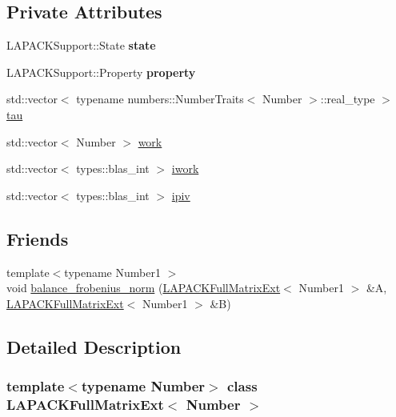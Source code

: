 \subsection*{Private Attributes}
\begin{DoxyCompactItemize}
\item 
\mbox{\label{classLAPACKFullMatrixExt_adec2cd643cd2bf3d66293f43e72af687}} 
L\+A\+P\+A\+C\+K\+Support\+::\+State {\bfseries state}
\item 
\mbox{\label{classLAPACKFullMatrixExt_a17c0100c66b9c4be46b87cbceea1be6d}} 
L\+A\+P\+A\+C\+K\+Support\+::\+Property {\bfseries property}
\item 
std\+::vector$<$ typename numbers\+::\+Number\+Traits$<$ Number $>$\+::real\+\_\+type $>$ \hyperlink{classLAPACKFullMatrixExt_a91fb784892cbe9d24ad2062fbf642635}{tau}
\item 
std\+::vector$<$ Number $>$ \hyperlink{classLAPACKFullMatrixExt_a971d29c6d7664fca553b6ba377519946}{work}
\item 
std\+::vector$<$ types\+::blas\+\_\+int $>$ \hyperlink{classLAPACKFullMatrixExt_ac091f1f6af485b451c4c9398abb67230}{iwork}
\item 
std\+::vector$<$ types\+::blas\+\_\+int $>$ \hyperlink{classLAPACKFullMatrixExt_a436d7290d5b2b17c0691b5b63cca36fa}{ipiv}
\end{DoxyCompactItemize}
\subsection*{Friends}
\begin{DoxyCompactItemize}
\item 
{\footnotesize template$<$typename Number1 $>$ }\\void \hyperlink{classLAPACKFullMatrixExt_a09f6d1d28781651841b905d663e733fc}{balance\+\_\+frobenius\+\_\+norm} (\hyperlink{classLAPACKFullMatrixExt}{L\+A\+P\+A\+C\+K\+Full\+Matrix\+Ext}$<$ Number1 $>$ \&A, \hyperlink{classLAPACKFullMatrixExt}{L\+A\+P\+A\+C\+K\+Full\+Matrix\+Ext}$<$ Number1 $>$ \&B)
\end{DoxyCompactItemize}


\subsection{Detailed Description}
\subsubsection*{template$<$typename Number$>$\newline
class L\+A\+P\+A\+C\+K\+Full\+Matrix\+Ext$<$ Number $>$}

